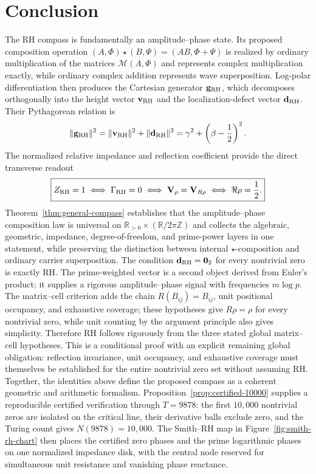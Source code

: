 \documentclass[11pt]{article}
\newcommand{\vzero}{\mathbf 0}
\begin{document}
\section{Conclusion}
The RH compass is fundamentally an amplitude--phase state.  Its proposed composition operation
$(A,\Phi)\star(B,\Psi)=(AB,\Phi+\Psi)$ is realized by ordinary multiplication of the matrices
$\mathcal M(A,\Phi)$ and represents complex multiplication exactly, while
ordinary complex addition represents wave superposition.  Log-polar differentiation then
produces the Cartesian generator $\mathbf g_{\rm RH}$, which decomposes orthogonally into the
height vector $\mathbf v_{\rm RH}$ and the localization-defect vector
$\mathbf d_{\rm RH}$.  Their Pythagorean relation is
\begin{equation}
 \|\mathbf g_{\rm RH}\|^2
 =\|\mathbf v_{\rm RH}\|^2+\|\mathbf d_{\rm RH}\|^2
 =\gamma^2+\left(\beta-\frac12\right)^2.
\end{equation}
The normalized relative impedance and reflection coefficient provide the direct transverse
readout
\begin{equation}
 \boxed{
 Z_{\rm RH}=1
 \iff \Gamma_{\rm RH}=0
 \iff \mathbf V_\rho=\mathbf V_{R\rho}
 \iff \Re\rho=\frac12.}
\end{equation}
Theorem~\ref{thm:general-compass} establishes that the amplitude--phase composition law is
universal on $\mathbb R_{>0}\times(\mathbb R/2\pi\mathbb Z)$ and collects the algebraic,
geometric, impedance, degree-of-freedom,
and prime-power layers in one statement, while preserving the distinction between internal
$\star$-composition and ordinary carrier superposition.
The condition $\mathbf d_{\rm RH}=\vzero_2$ for every nontrivial zero is exactly RH.  The
prime-weighted vector is a second object derived from Euler's product; it supplies a rigorous
amplitude--phase signal with frequencies $m\log p$.  The matrix--cell criterion adds the chain
$R(B_{ij})=B_{ij}$, unit positional occupancy, and exhaustive coverage; these hypotheses give
$R\rho=\rho$ for every nontrivial zero, while unit counting by the argument principle also gives
simplicity.  Therefore RH follows rigorously from the three stated global matrix--cell
hypotheses.  This is a conditional proof with an explicit remaining global obligation:
reflection invariance, unit occupancy, and exhaustive coverage must themselves be established
for the entire nontrivial zero set without assuming RH.  Together, the identities above define
the proposed compass as a coherent geometric and arithmetic formalism.
Proposition~\ref{prop:certified-10000} supplies a reproducible
certified verification through $T=9878$: the first $10{,}000$ nontrivial zeros are isolated on the critical line, their
derivative balls exclude zero, and the Turing count gives $N(9878)=10{,}000$.
The Smith--RH map in Figure~\ref{fig:smith-rh-chart} then places the certified zero phases and
the prime logarithmic phases on one normalized impedance disk, with the central node reserved
for simultaneous unit resistance and vanishing phase reactance.
\end{document}
